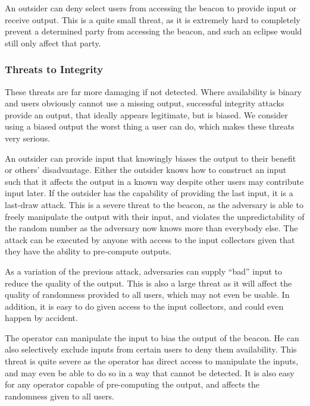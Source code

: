 An outsider can deny select users from accessing the beacon to provide input or receive output.
This is a quite small threat, as it is extremely hard to completely prevent a determined party from accessing the beacon, and such an eclipse would still only affect that party.

\subsubsection{Threats to Integrity}
These threats are far more damaging if not detected. Where availability is binary and users obviously cannot use a missing output, successful integrity attacks provide an output, that ideally appears legitimate, but is biased. We consider using a biased output the worst thing a user can do, which makes these threats very serious.

An outsider can provide input that knowingly biases the output to their benefit or others' disadvantage.
Either the outsider knows how to construct an input such that it affects the output in a known way despite other users may contribute input later.
If the outsider has the capability of providing the last input, it is a last-draw attack.
This is a severe threat to the beacon, as the adversary is able to freely manipulate the output with their input, and violates the unpredictability of the random number as the adversary now knows more than everybody else.
The attack can be executed by anyone with access to the input collectors given that they have the ability to pre-compute outputs.

As a variation of the previous attack, adversaries can supply \enquote{bad} input to reduce the quality of the output.
This is also a large threat as it will affect the quality of randomness provided to all users, which may not even be usable.
In addition, it is easy to do given access to the input collectors, and could even happen by accident.

The operator can manipulate the input to bias the output of the beacon.
He can also selectively exclude inputs from certain users to deny them availability.
This threat is quite severe as the operator has direct access to manipulate the inputs, and may even be able to do so in a way that cannot be detected.
It is also easy for any operator capable of pre-computing the output, and affects the randomness given to all users.

